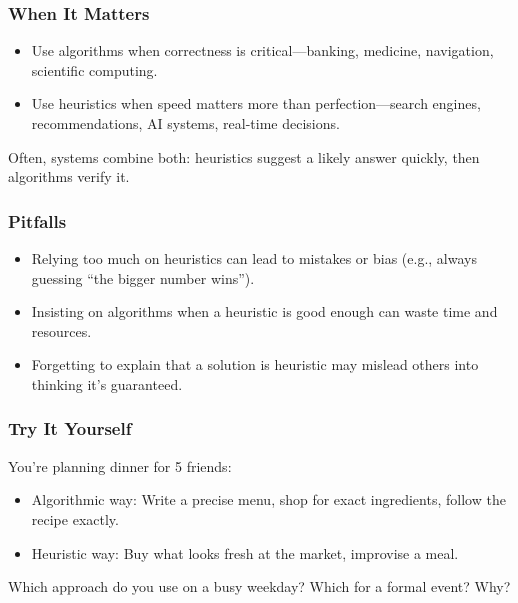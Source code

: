 \documentclass[
  letterpaper,
  DIV=11,
  numbers=noendperiod]{scrreprt}
\providecommand{\tightlist}{%
  \setlength{\itemsep}{0pt}\setlength{\parskip}{0pt}}
\begin{document}
\subsubsection{When It Matters}\label{when-it-matters-6}

\begin{itemize}
\tightlist
\item
  Use algorithms when correctness is critical---banking, medicine,
  navigation, scientific computing.
\item
  Use heuristics when speed matters more than perfection---search
  engines, recommendations, AI systems, real-time decisions.
\end{itemize}

Often, systems combine both: heuristics suggest a likely answer quickly,
then algorithms verify it.

\subsubsection{Pitfalls}\label{pitfalls-5}

\begin{itemize}
\tightlist
\item
  Relying too much on heuristics can lead to mistakes or bias (e.g.,
  always guessing ``the bigger number wins'').
\item
  Insisting on algorithms when a heuristic is good enough can waste time
  and resources.
\item
  Forgetting to explain that a solution is heuristic may mislead others
  into thinking it's guaranteed.
\end{itemize}

\subsubsection{Try It Yourself}\label{try-it-yourself-8}

You're planning dinner for 5 friends:

\begin{itemize}
\tightlist
\item
  Algorithmic way: Write a precise menu, shop for exact ingredients,
  follow the recipe exactly.
\item
  Heuristic way: Buy what looks fresh at the market, improvise a meal.
\end{itemize}

Which approach do you use on a busy weekday? Which for a formal event?
Why?
\end{document}
